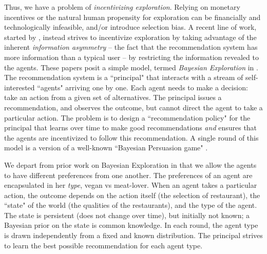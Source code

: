Thus, we have a problem of \emph{incentivizing exploration}.
Relying on monetary incentives or the natural human propensity for exploration can be financially and technologically infeasible, and/or introduce selection bias.
%
%
A recent line of work, started by \cite{Kremer-JPE14}, instead strives to incentivize exploration by taking advantage of the inherent \emph{information asymmetry} -- the fact that the recommendation system has more information than a typical user -- by restricting the information revealed to the agents. These papers posit a simple model, termed \emph{Bayesian Exploration} in \cite{ICexplorationGames-ec16}. The recommendation system is a ``principal" that interacts with a stream of self-interested ``agents" arriving one by one. Each agent needs to make a decision: take an action from a given set of alternatives. The principal issues a recommendation, %
and observes the outcome, but cannot direct the agent to take a particular action. The problem is to design a ``recommendation policy" for the principal that learns over time to make good recommendations \emph{and} ensures that the agents are incentivized to follow this recommendation.
A single round of this model is a version of a well-known ``Bayesian Persuasion game" \cite{Kamenica-aer11}.

We depart from prior work on Bayesian Exploration in that we allow the agents to have different preferences from one another. The preferences of an agent are encapsulated in her {\em type}, \eg vegan vs meat-lover.
When an agent takes a particular action, the outcome depends on the action itself (\eg the selection of restaurant), the ``state" of the world (\eg the qualities of the restaurants), and the type of the agent. The state is persistent (does not change over time), but initially not known; a Bayesian prior on the state is common knowledge. In each round, the agent type is drawn independently from a fixed and known distribution. The principal strives to learn the best possible recommendation for each agent type.


